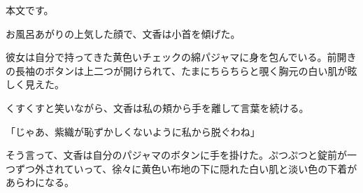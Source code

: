 
本文です。

\Sepa

お風呂あがりの上気した顔で、文香は小首を傾げた。

彼女は自分で持ってきた黄色いチェックの綿パジャマに身を包んでいる。前開きの長袖のボタンは上二つが開けられて、たまにちらちらと覗く胸元の白い肌が眩しく見えた。

\Sepa

くすくすと笑いながら、文香は私の頬から手を離して言葉を続ける。

「じゃあ、紫織が恥ずかしくないように私から脱ぐわね」

そう言って、文香は自分のパジャマのボタンに手を掛けた。ぷつぷつと錠前が一つずつ外されていって、徐々に黄色い布地の下に隠れた白い肌と淡い色の下着があらわになる。
